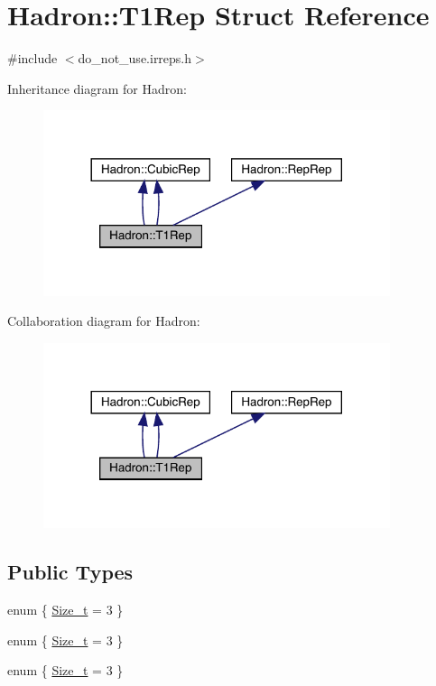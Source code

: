 \hypertarget{structHadron_1_1T1Rep}{}\section{Hadron\+:\+:T1\+Rep Struct Reference}
\label{structHadron_1_1T1Rep}


{\ttfamily \#include $<$do\+\_\+not\+\_\+use.\+irreps.\+h$>$}



Inheritance diagram for Hadron\+:\nopagebreak
\begin{figure}[H]
\begin{center}
\leavevmode
\includegraphics[width=288pt]{d7/d7b/structHadron_1_1T1Rep__inherit__graph}
\end{center}
\end{figure}


Collaboration diagram for Hadron\+:\nopagebreak
\begin{figure}[H]
\begin{center}
\leavevmode
\includegraphics[width=288pt]{d5/d6c/structHadron_1_1T1Rep__coll__graph}
\end{center}
\end{figure}
\subsection*{Public Types}
\begin{DoxyCompactItemize}
\item 
enum \{ \mbox{\hyperlink{structHadron_1_1T1Rep_a6f562e59675e14071d25dc4953923266a9e0e2632c004c18c794ed8666cdba154}{Size\+\_\+t}} = 3
 \}
\item 
enum \{ \mbox{\hyperlink{structHadron_1_1T1Rep_a6f562e59675e14071d25dc4953923266a9e0e2632c004c18c794ed8666cdba154}{Size\+\_\+t}} = 3
 \}
\item 
enum \{ \mbox{\hyperlink{structHadron_1_1T1Rep_a6f562e59675e14071d25dc4953923266a9e0e2632c004c18c794ed8666cdba154}{Size\+\_\+t}} = 3
 \}
\end{DoxyCompactItemize}
